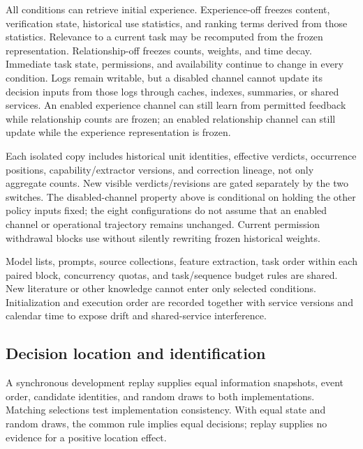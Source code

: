 \documentclass[
  english,
  11pt,
]{article}
\begin{document}
All conditions can retrieve initial experience. Experience-off freezes
content, verification state, historical use statistics, and ranking
terms derived from those statistics. Relevance to a current task may be
recomputed from the frozen representation. Relationship-off freezes
counts, weights, and time decay. Immediate task state, permissions, and
availability continue to change in every condition. Logs remain
writable, but a disabled channel cannot update its decision inputs from
those logs through caches, indexes, summaries, or shared services. An
enabled experience channel can still learn from permitted feedback while
relationship counts are frozen; an enabled relationship channel can
still update while the experience representation is frozen.

Each isolated copy includes historical unit identities, effective
verdicts, occurrence positions, capability/extractor versions, and
correction lineage, not only aggregate counts. New visible
verdicts/revisions are gated separately by the two switches. The
disabled-channel property above is conditional on holding the other
policy inputs fixed; the eight configurations do not assume that an
enabled channel or operational trajectory remains unchanged. Current
permission withdrawal blocks use without silently rewriting frozen
historical weights.

Model lists, prompts, source collections, feature extraction, task order
within each paired block, concurrency quotas, and task/sequence budget
rules are shared. New literature or other knowledge cannot enter only
selected conditions. Initialization and execution order are recorded
together with service versions and calendar time to expose drift and
shared-service interference.

\subsection{Decision location and
identification}\label{decision-location-and-identification}

A synchronous development replay supplies equal information snapshots,
event order, candidate identities, and random draws to both
implementations. Matching selections test implementation consistency.
With equal state and random draws, the common rule implies equal
decisions; replay supplies no evidence for a positive location effect.
\end{document}
